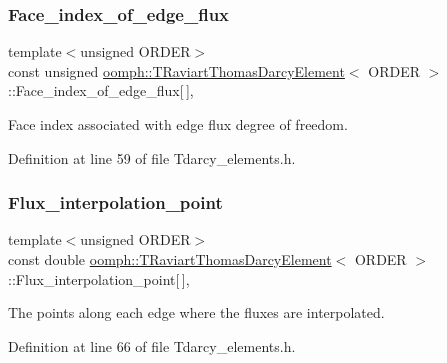 \subsubsection{\texorpdfstring{Face\+\_\+index\+\_\+of\+\_\+edge\+\_\+flux}{Face\_index\_of\_edge\_flux}}
{\footnotesize\ttfamily template$<$unsigned O\+R\+D\+ER$>$ \\
const unsigned \hyperlink{classoomph_1_1TRaviartThomasDarcyElement}{oomph\+::\+T\+Raviart\+Thomas\+Darcy\+Element}$<$ O\+R\+D\+ER $>$\+::Face\+\_\+index\+\_\+of\+\_\+edge\+\_\+flux\mbox{[}$\,$\mbox{]}\hspace{0.3cm}{\ttfamily [static]}, {\ttfamily [private]}}



Face index associated with edge flux degree of freedom. 



Definition at line 59 of file Tdarcy\+\_\+elements.\+h.

\mbox{\label{classoomph_1_1TRaviartThomasDarcyElement_aa8ccb00e2e8aa63690226fad93b7b1e8}} 
\subsubsection{\texorpdfstring{Flux\+\_\+interpolation\+\_\+point}{Flux\_interpolation\_point}}
{\footnotesize\ttfamily template$<$unsigned O\+R\+D\+ER$>$ \\
const double \hyperlink{classoomph_1_1TRaviartThomasDarcyElement}{oomph\+::\+T\+Raviart\+Thomas\+Darcy\+Element}$<$ O\+R\+D\+ER $>$\+::Flux\+\_\+interpolation\+\_\+point\mbox{[}$\,$\mbox{]}\hspace{0.3cm}{\ttfamily [static]}, {\ttfamily [private]}}



The points along each edge where the fluxes are interpolated. 



Definition at line 66 of file Tdarcy\+\_\+elements.\+h.

\mbox{\label{classoomph_1_1TRaviartThomasDarcyElement_a703400ff2df7722ffd9771c22bd70811}} 
